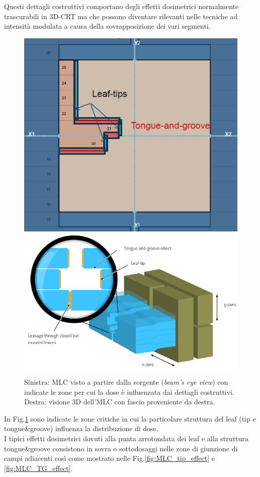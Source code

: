 Questi dettagli costruttivi comportano degli effetti dosimetrici normalmente trascurabili in 3D-CRT ma che possono diventare rilevanti nelle tecniche ad intensità modulata a causa della sovrapposizione dei vari segmenti.
\begin{figure}[!t]
\centering
\includegraphics[width=.4\textwidth]{./cap2/MLC_tip-tg.png}
\includegraphics[width=.55\textwidth]{./cap2/MLC_tip-tg_3D.png}
\caption{Sinistra: MLC visto a partire dalla sorgente (\textit{beam's eye view}) con indicate le zone per cui la dose è influenzata dai dettagli costruttivi. Destra: visione 3D dell'MLC con fascio proveniente da destra.}
\label{fig:MLC_Regions}
\end{figure}
In Fig.\ref{fig:MLC_Regions} sono indicate le zone critiche in cui la particolare struttura del leaf (tip e tongue\&{}groove) influenza la distribuzione di dose.\\
I tipici effetti dosimetrici dovuti alla punta arrotondata dei leaf e alla struttura tongue\&{}groove consistono in sovra o sottodosaggi nelle zone di giunzione di campi adiacenti così come mostrato nelle Fig.\ref{fig:MLC_tip_effect} e \ref{fig:MLC_TG_effect}.
